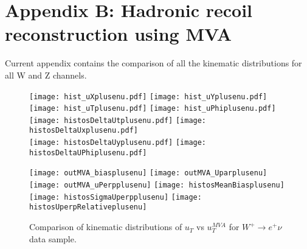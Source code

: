 \chapter*{Appendix B: Hadronic recoil reconstruction using MVA}
    Current appendix contains the comparison of all the kinematic distributions for all W and Z channels.
    
    \begin{figure}[h]
    	\centering
    	{\texttt{[image: hist\_uXplusenu.pdf]}}
    	{\texttt{[image: hist\_uYplusenu.pdf]}} \\
    	{\texttt{[image: hist\_uTplusenu.pdf]}}
    	{\texttt{[image: hist\_uPhiplusenu.pdf]}}\\
    	{\texttt{[image: histosDeltaUtplusenu.pdf]}}
    	{\texttt{[image: histosDeltaUxplusenu.pdf]}} \\
    	{\texttt{[image: histosDeltaUyplusenu.pdf]}}
    	{\texttt{[image: histosDeltaUPhiplusenu.pdf]}}\\
    	\label{fig:plusenu_data_distributions1}
    \end{figure}
    \begin{figure}[h]
    	\centering
    	{\texttt{[image: outMVA\_biasplusenu]}}
    	{\texttt{[image: outMVA\_Uparplusenu]}}
    	{\texttt{[image: outMVA\_uPerpplusenu]}}
    	{\texttt{[image: histosMeanBiasplusenu]}}
    	{\texttt{[image: histosSigmaUperpplusenu]}}
    	{\texttt{[image: histosUperpRelativeplusenu]}}
    	\caption{Comparison of kinematic distributions of $u_T$ vs $u_T^{MVA}$ for $W^+\rightarrow e^+\nu$ data sample.}
    	\label{fig:plusenu_data_distributions2}
    \end{figure}
    
